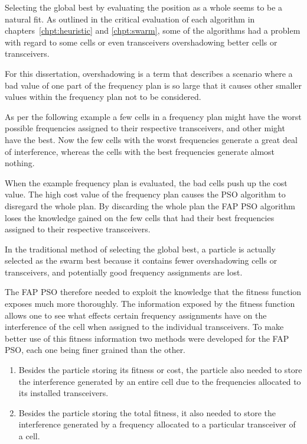 Selecting the global best by evaluating the position as a whole seems to be a natural fit. As outlined in the critical evaluation of each algorithm in chapters~\ref{chpt:heuristic} and \ref{chpt:swarm}, some of the algorithms had a problem with regard to some cells or even transceivers overshadowing better cells or transceivers.

For this dissertation, overshadowing is a term that describes a scenario where a bad value of one part of the frequency plan is so large that it causes other smaller values within the frequency plan not to be considered. 

As per the following example a few cells in a frequency plan might have the worst possible frequencies assigned to their respective transceivers, and other might have the best. Now the few cells with the worst frequencies generate a great deal of interference, whereas the cells with the best frequencies generate almost nothing.

When the example frequency plan is evaluated, the bad cells push up the cost value. The high cost value of the frequency plan causes the PSO algorithm to disregard the whole plan. By discarding the whole plan the FAP PSO algorithm loses the knowledge gained on the few cells that had their best frequencies assigned to their respective transceivers.

In the traditional method of selecting the global best, a particle is actually selected as the swarm best because it contains fewer overshadowing cells or transceivers, and potentially good frequency assignments are lost.

The FAP PSO therefore needed to exploit the knowledge that the fitness function exposes much more thoroughly. The information exposed by the fitness function allows one to see what effects certain frequency assignments have on the interference of the cell when assigned to the individual transceivers. To make better use of this fitness information two methods were developed for the FAP PSO, each one being finer grained than the other.

\begin{enumerate}
\item Besides the particle storing its fitness or cost, the particle also needed to store the interference generated by an entire cell due to the frequencies allocated to its installed transceivers.
\item Besides the particle storing the total fitness, it also needed to store the interference generated by a frequency allocated to a particular transceiver of a cell.
\end{enumerate}

